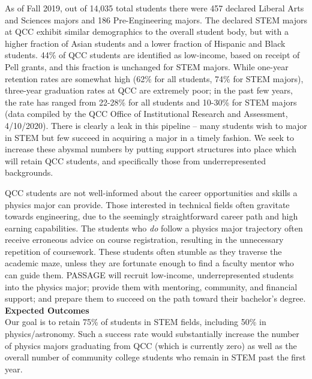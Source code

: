 \documentclass[12pt]{article}
\begin{document}
As of Fall 2019, out of 14,035 total students there were 457 declared Liberal Arts and Sciences majors and 186 Pre-Engineering majors.  The declared STEM majors at QCC exhibit similar demographics to the overall student body, but with a higher fraction of Asian students and a lower fraction of Hispanic and Black students.   44\% of QCC students are identified as low-income, based on receipt of Pell grants, and this fraction is unchanged for STEM majors.  While one-year retention rates are somewhat high (62\% for all students, 74\% for STEM majors), three-year graduation rates at QCC are extremely poor; in the past few years, the rate has ranged from 22-28\% for all students and 10-30\% for STEM majors (data compiled by the QCC Office of Institutional Research and Assessment, 4/10/2020).  There is clearly a leak in this pipeline -- many students wish to major in STEM but few succeed in acquiring a major in a timely fashion.  We seek to increase these abysmal numbers by putting support structures into place which will retain QCC students, and specifically those from underrepresented backgrounds.



QCC students are not well-informed about the career opportunities and skills a physics major can provide.  
Those interested in technical fields often gravitate towards engineering, due to the seemingly straightforward career path and high earning capabilities.  The students who {\em do} follow a physics major trajectory often receive erroneous advice on course registration, resulting in the unnecessary repetition of coursework.  These students often stumble as they traverse the academic maze, unless they are fortunate enough to find a faculty mentor who can guide them.  PASSAGE will recruit low-income, underrepresented students into the physics major; provide them with mentoring, community, and financial support; and prepare them to succeed on the path toward their bachelor's degree.\\

\noindent
{\bf Expected Outcomes}\\
\noindent
Our goal is to retain 75\% of students in STEM fields, including 50\% in physics/astronomy.  Such a success rate would substantially increase the number of physics majors graduating from QCC (which is currently zero) as well as the overall number of community college students who remain in STEM past the first year.  
\end{document}
